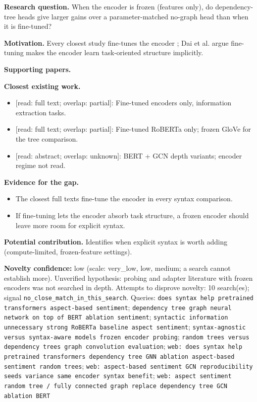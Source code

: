 \documentclass[11pt,a4paper]{article}
\begin{document}
\textbf{Research question.} When the encoder is frozen (features only), do dependency-tree heads give larger gains over a parameter-matched no-graph head than when it is fine-tuned?

\textbf{Motivation.} Every closest study fine-tunes the encoder \cite{dai2021syntax,sachan2021syntax}; Dai et al. argue fine-tuning makes the encoder learn task-oriented structure implicitly.

\textbf{Supporting papers.} \cite{dai2021syntax,sachan2021syntax}

\textbf{Closest existing work.}
\begin{itemize}
\item \cite{sachan2021syntax} [read: full text; overlap: partial]: Fine-tuned encoders only, information extraction tasks.
\item \cite{dai2021syntax} [read: full text; overlap: partial]: Fine-tuned RoBERTa only; frozen GloVe for the tree comparison.
\item \cite{hou2021sagcn} [read: abstract; overlap: unknown]: BERT + GCN depth variants; encoder regime not read.
\end{itemize}

\textbf{Evidence for the gap.}
\begin{itemize}
\item [V] The closest full texts fine-tune the encoder in every syntax comparison. \cite{dai2021syntax,sachan2021syntax}
\item [S] If fine-tuning lets the encoder absorb task structure, a frozen encoder should leave more room for explicit syntax.
\end{itemize}

\textbf{Potential contribution.} Identifies when explicit syntax is worth adding (compute-limited, frozen-feature settings).

\textbf{Novelty confidence:} low (scale: very\_low, low, medium; a search cannot establish more). Unverified hypothesis: probing and adapter literature with frozen encoders was not searched in depth.
Attempts to disprove novelty: 10 search(es); signal \texttt{no\_close\_match\_in\_this\_search}. Queries: \texttt{does syntax help pretrained transformers aspect-based sentiment}; \texttt{dependency tree graph neural network on top of BERT ablation sentiment}; \texttt{syntactic information unnecessary strong RoBERTa baseline aspect sentiment}; \texttt{syntax-agnostic versus syntax-aware models frozen encoder probing}; \texttt{random trees versus dependency trees graph convolution evaluation}; \texttt{web: does syntax help pretrained transformers dependency tree GNN ablation aspect-based sentiment random trees}; \texttt{web: aspect-based sentiment GCN reproducibility seeds variance same encoder syntax benefit}; \texttt{web: aspect sentiment random tree / fully connected graph replace dependency tree GCN ablation BERT}
\end{document}
